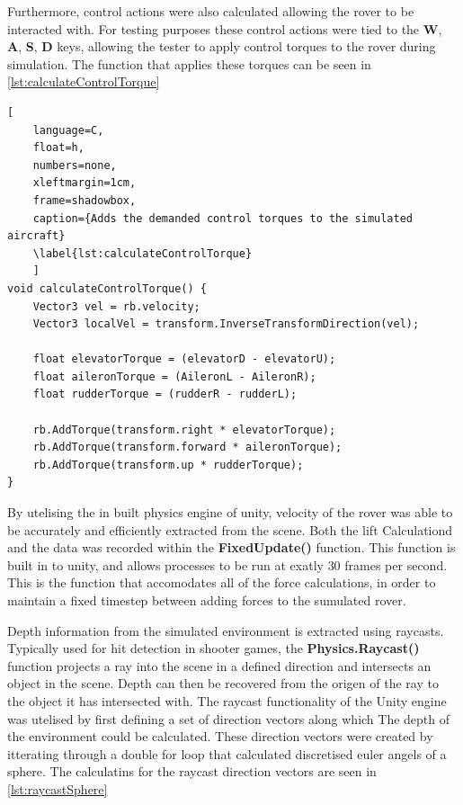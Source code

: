 \documentclass{UoNMCHA}
\numberwithin{equation}{section}
\begin{document}
Furthermore, control actions were also calculated allowing the rover to be interacted with. For testing purposes these control actions were tied to the \textbf{W}, \textbf{A}, \textbf{S}, \textbf{D} keys, allowing the tester to apply control torques to the rover during simulation. The function that applies these torques can be seen in \cref{lst:calculateControlTorque}

\begin{lstlisting}[
    language=C,
	float=h,
	numbers=none,
    xleftmargin=1cm,
    frame=shadowbox,
	caption={Adds the demanded control torques to the simulated aircraft}
	\label{lst:calculateControlTorque}
	]
void calculateControlTorque() {
	Vector3 vel = rb.velocity;
	Vector3 localVel = transform.InverseTransformDirection(vel);

	float elevatorTorque = (elevatorD - elevatorU);
	float aileronTorque = (AileronL - AileronR);
	float rudderTorque = (rudderR - rudderL);

	rb.AddTorque(transform.right * elevatorTorque);
	rb.AddTorque(transform.forward * aileronTorque);
	rb.AddTorque(transform.up * rudderTorque);
}
\end{lstlisting}

By utelising the in built physics engine of unity, velocity of the rover was able to be accurately and efficiently extracted from the scene. Both the lift Calculationd and the data was recorded within the \textbf{FixedUpdate()} function. This function is built in to unity, and allows processes to be run at exatly $30$ frames per second. This is the function that accomodates all of the force calculations, in order to maintain a fixed timestep between adding forces to the sumulated rover.

Depth information from the simulated environment is extracted using raycasts. Typically used for hit detection in shooter games, the \textbf{Physics.Raycast()} function projects a ray into the scene in a defined direction and intersects an object in the scene. Depth can then be recovered from the origen of the ray to the object it has intersected with. The raycast functionality of the Unity engine was utelised by first defining a set of direction vectors along which The depth of the environment could be calculated. These direction vectors were created by itterating through a double for loop that calculated discretised euler angels of a sphere. The calculatins for the raycast direction vectors are seen in \cref{lst:raycastSphere}
\end{document}
